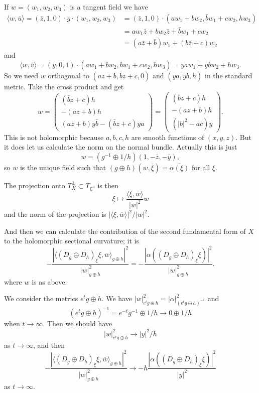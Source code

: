 \documentclass[11pt]{amsart}
\theoremstyle{definition}
\newcommand{\kk}[1]{\mathbb{#1}}
\def\ov#1{\overline{#1}}
\def\<{\langle}
\def\>{\rangle}
\begin{document}
If $w = (w_1, w_2, w_3)$ is a tangent field we have
\begin{align*}
\<w, \ov u \>
= (\bar z, 1, 0) \cdot g \cdot (w_1, w_2, w_3)
&= (\bar z, 1, 0) \cdot (a w_1 + b w_2, \bar b w_1 + c w_2, h w_3)
\\
&= a w_1 \bar z + b w_2 \bar z + \bar b w_1 + c w_2
\\
&= (a \bar z + \bar b) w_1 + (b \bar z + c) w_2
\end{align*}
and
$$
\< w, \ov v \>
= (\bar y, 0, 1) \cdot (a w_1 + b w_2, \bar b w_1 + c w_2, h w_3)
= \bar y a w_1 + \bar y b w_2 + h w_3.
$$
So we need $w$ orthogonal to $(a z + b, \bar b z + c, 0)$ and $(y a, y
\bar b, h)$ in the standard metric. Take the cross product and get
$$
w
= \begin{pmatrix}
(\bar b z + c)h
\\
- (a z + b) h
\\
(a z + b)y\bar b - (\bar b z + c)ya
\end{pmatrix}
= \begin{pmatrix}
(\bar b z + c)h
\\
- (a z + b) h
\\
(|b|^2 - ac)y
\end{pmatrix}.
$$
This is not holomorphic because $a,b,c,h$ are smooth functions of $(x,y,z)$.
But it does let us calculate the norm on the normal bundle.
Actually this is just
$$
w = (g^{-1} \oplus 1/h)(1, -\bar z, -\bar y),
$$
so $w$ is the unique field such that $(g \oplus h)(w, \ov \xi) = \ov{\alpha(\xi)}$ for all $\xi$.

The projection onto $T_X^\perp \subset T_{\kk C^3}$ is then
$$
\xi \mapsto \frac{\< \xi, \ov w \>}{|w|^2} w
$$
and the norm of the projection is $|\<\xi, \ov w \>|^2/|w|^2$.

And then we can calculate the contribution of the second fundamental form of $X$
to the holomorphic sectional curvature; it is
$$
-\frac{|\< (D_g \oplus D_h)_\xi \xi, \ov w \>_{g \oplus h}|^2}{|w|^2_{g\oplus h}}
= -\frac{|\alpha((D_g \oplus D_h)_\xi \xi)|^2}{|w|^2_{g\oplus h}}.
$$
where $w$ is as above.

We consider the metrics $e^t g \oplus h$.
We have $|w|^2_{e^tg \oplus h} = |\alpha|^2_{(e^tg \oplus h)^{-1}}$
and
$$
(e^tg \oplus h)^{-1}
= e^{-t} g^{-1} \oplus 1/h
\to 0 \oplus 1/h
$$
when $t \to \infty$.
Then we should have
$$
|w|^2_{e^tg \oplus h}
\to |y|^2/h
$$
as $t \to \infty$, and then
$$
-\frac{|\< (D_g \oplus D_h)_\xi \xi, \ov w \>_{g \oplus h}|^2}{|w|^2_{g\oplus h}}
\to -h\frac{|\alpha((D_g \oplus D_h)_\xi \xi)|^2}{|y|^2}
$$
as $t \to \infty$.
\end{document}

